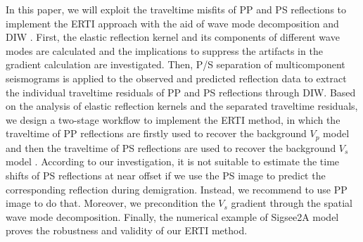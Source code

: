 \documentclass[extra,mreferee]{gji}
\begin{document}



In this paper,
we will exploit the traveltime misfits of PP and PS reflections to implement the ERTI
approach with the aid
of wave mode decomposition and DIW \cite[]{Hale2013}.
First,
the elastic reflection kernel and its components of different wave modes are
calculated and the implications to suppress the artifacts in the gradient calculation
are investigated.
Then, P/S separation of multicomponent seismograms is applied to the observed and predicted reflection data
to extract the individual traveltime residuals of PP and PS reflections through DIW.
Based on the analysis of elastic reflection kernels and the separated traveltime residuals,
we design a two-stage workflow to implement
the ERTI method,
in which the traveltime of PP reflections are firstly used to recover the background
$V_p$ model and then the traveltime of PS reflections are used to recover the background $V_s$ model
.
According to our investigation, it is not suitable to estimate the time shifts of PS
reflections at near offset if we
use the PS image to predict the corresponding reflection during demigration.
Instead, we recommend to use PP image to do that.
Moreover, we precondition the $V_s$ gradient through the spatial wave mode
decomposition.
Finally, the numerical example of Sigsee2A model proves the robustness and validity of our
ERTI method.
\end{document}
